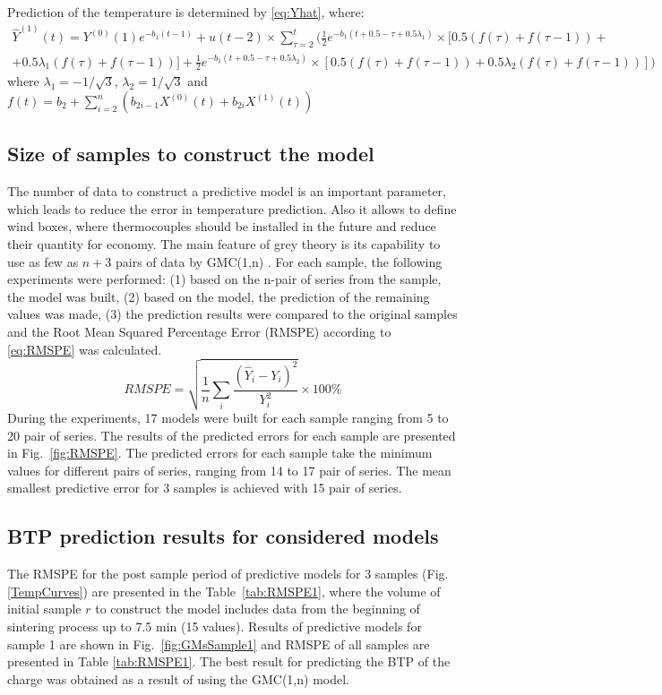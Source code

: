 \documentclass[AMS,STIX2COL]{WileyNJD-v2}
\begin{document}
Prediction of the temperature is determined by \eqref{eq:Yhat}, where:
\begin{align}
\hat{Y}^{(1)}(t)=Y^{(0)}(1)e^{-b_1(t-1)} + u(t-2) \times  \sum_{\tau=2}^{t}(\frac{1}{2}e^{-b_1(t+0.5-\tau+0.5\lambda_1)}\times
[0.5\left( f(\tau)+f(\tau-1) \right) + \nonumber\\
+0.5\lambda_1\left( f(\tau)+f(\tau-1) \right) ]+\frac{1}{2}e^{-b_1(t+0.5-\tau+0.5\lambda_2)}
\times[0.5\left( f(\tau)+f(\tau-1) \right) + 0.5\lambda_2\left( f(\tau)+f(\tau-1) \right) ]  )\
\end{align}
where $\lambda_1 = -1/\sqrt{3}$, $\lambda_2 = 1/\sqrt{3}$ and
$
f(t) = b_2 + \sum_{i=2}^{n}\left(b_{2i-1}X^{(0)}(t)+b_{2i}X^{(1)}(t)\right)
$

\subsection{Size of samples to construct the model}
The number of data to construct a predictive model is an important parameter, which leads to reduce the error in temperature prediction. Also it allows to define wind boxes, where thermocouples should be installed in the future and reduce their quantity for economy. The main feature of grey theory is its capability to use as few as $n+3$ pairs of data by GMC(1,n) \cite{Tien2005}. For each sample, the following experiments were performed: (1) based on the n-pair of series from the sample, the model was built, (2)	based on the model, the prediction of the remaining values was made, (3) the prediction results were compared to the original samples and the Root Mean Squared Percentage Error (RMSPE) according to \eqref{eq:RMSPE} was calculated.
\begin{equation} \label{eq:RMSPE}
RMSPE = \sqrt{\frac{1}{n}\sum_{i}\frac{\left(\hat{Y}_i-Y_i\right)^2}{Y_i^2}}\times 100\%
\end{equation}
During the experiments, 17 models were built for each sample ranging from 5 to 20 pair of series. The results of the predicted errors for each sample are presented in Fig.~\ref{fig:RMSPE}.
The predicted errors for each sample take the minimum values for different pairs of series, ranging from 14 to 17 pair of series. The mean smallest predictive error for 3 samples is achieved with 15 pair of series.

\subsection{BTP prediction results for considered models}
The RMSPE for the post sample period of predictive models for 3 samples (Fig. \ref{TempCurves}) are presented in the Table~\ref{tab:RMSPE1}, where the volume of initial sample $r$  to construct the model includes data from the beginning of sintering process up to 7.5 min (15 values). Results of predictive models for sample 1 are shown in Fig.~\ref{fig:GMsSample1} and RMSPE of all samples are presented in Table \ref{tab:RMSPE1}. The best result for predicting the BTP of the charge was obtained as a result of using the GMC(1,n) model.  
\end{document}
